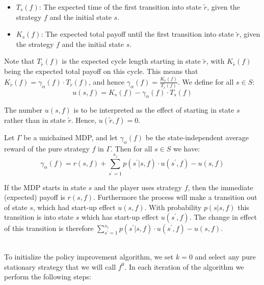 \documentclass[12pt]{article}
\begin{document}
\begin{itemize}
    \item $T_s(f)$: The expected time of the first transition into state $\tilde{r}$, given the strategy $f$ and the initial state $s$.
    \item $K_s(f)$: The expected total payoff until the first transition into state $\tilde{r}$, given the strategy $f$ and the initial state $s$.
\end{itemize}

\noindent
Note that $T_{\tilde{r}}(f)$ is the expected cycle length starting in state $\tilde{r}$, with $K_{\tilde{r}}(f)$ being the expected total payoff on this cycle.
This means that $K_{\tilde{r}}(f) = \gamma_\alpha(f) \cdot T_{\tilde{r}}(f)$, and hence $\gamma_\alpha(f) = \frac{K_{\tilde{r}}(f)}{T_{\tilde{r}}(f)}$.
We define for all $s \in S$:
\[ u(s, f) = K_s(f) - \gamma_\alpha(f) \cdot T_s(f) \]

\noindent
The number $u(s, f)$ is to be interpreted as the effect of starting in state $s$ rather than in state $\tilde{r}$.
Hence, $u(\tilde{r}, f) = 0$.

\newpage
\noindent
Let $\Gamma$ be a unichained MDP, and let $\gamma_\alpha(f)$ be the state-independent average reward of the pure strategy $f$ in $\Gamma$.
Then for all $s \in S$ we have:
\[ \gamma_\alpha(f) = r(s, f) + \sum_{s^\prime = 1}^{s_z} p(s^\prime | s, f) \cdot u(s^\prime, f) - u(s, f) \]

\noindent
If the MDP starts in state $s$ and the player uses
strategy $f$, then the immediate (expected) payoff is $r(s, f)$.
Furthermore the process will make a transition out of state $s$, which had start-up effect $u(s,f)$.
With probability $p(s | s, f)$ this transition is into state $s$ which has start-up effect $u(s^\prime, f)$.
The change in effect of this transition is therefore $\sum_{s^\prime = 1}^{s_z} p(s^\prime | s, f) \cdot u(s^\prime, f) - u(s, f)$.

\noindent
\\
To initialize the policy improvement algorithm, we set $k = 0$ and select any pure stationary strategy that we will call $f^0$.
In each iteration of the algorithm we perform the following steps:
\end{document}
